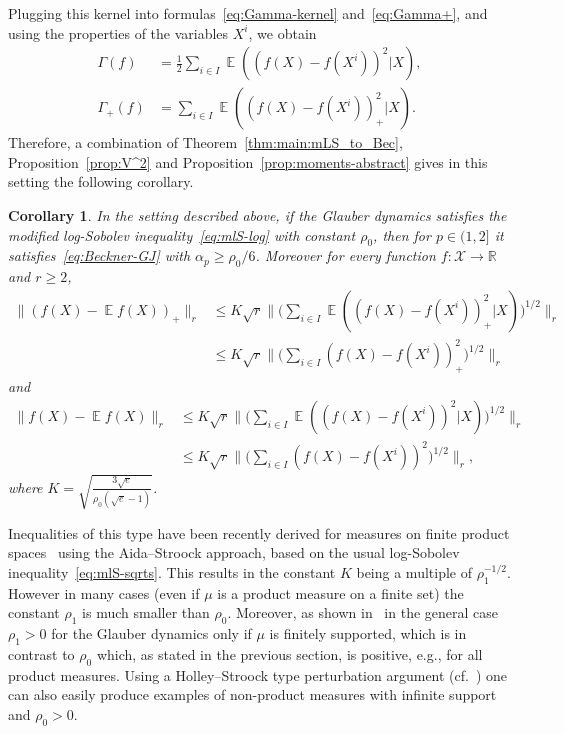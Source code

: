 \documentclass[a4paper]{amsart}
\newtheorem{corollary}[theorem]{Corollary} %
\theoremstyle{definition}
\theoremstyle{remark}
\numberwithin{equation}{section}
\newcommand*{\RR}{\mathbb{R}}
\DeclareMathOperator{\EE}{\mathbb{E}} %
\begin{document}
Plugging this kernel into formulas~\eqref{eq:Gamma-kernel} and~\eqref{eq:Gamma+}, and using the properties of the variables $X^i$, we obtain
\begin{align*}
  \Gamma(f) &= \frac{1}{2}\sum_{i\in I} \EE((f(X) - f(X^i))^2|X),\\
\Gamma_+(f) &= \sum_{i\in I} \EE((f(X) - f(X^i))^2_+|X).
\end{align*}
Therefore, a combination of Theorem~\ref{thm:main:mLS_to_Bec}, Proposition~\ref{prop:V^2} and Proposition~\ref{prop:moments-abstract} gives in this setting the following corollary.

\begin{corollary}\label{cor:Glauber}
In the setting described above, if the Glauber dynamics satisfies the modified log-Sobolev inequality~\eqref{eq:mlS-log} with constant $\rho_0$, then for $p \in (1,2]$ it satisfies~\eqref{eq:Beckner-GJ} with $\alpha_p \ge \rho_0/6$. Moreover for every function $f\colon \mathcal{X}\to \RR$ and $r\ge 2$,
\begin{align*}
  \|(f(X) - \EE f(X))_+\|_r  &\le K\sqrt{r}\Big \| \Big(\sum_{i\in I} \EE((f(X) - f(X^i))^2_+|X)\Big)^{1/2}\Big\|_r\\
 &\le K\sqrt{r}\Big \| \Big( \sum_{i\in I} (f(X) - f(X^i))^2_+\Big)^{1/2}\Big\|_r
\end{align*}
and
\begin{align*}
\|f(X) - \EE f(X)\|_r
&\le K\sqrt{r}\Big \| \Big(\sum_{i\in I} \EE((f(X) - f(X^i))^2|X)\Big)^{1/2}\Big\|_r\\
&\le K\sqrt{r}\Big \| \Big(\sum_{i\in I} (f(X) - f(X^i))^2\Big)^{1/2}\Big\|_r,
\end{align*}
where $K = \sqrt{\frac{3\sqrt{e}}{\rho_0(\sqrt{e}-1)}}$.
\end{corollary}

Inequalities of this type have been recently derived for measures on finite product spaces~\cite{gtze2018higher} using the Aida--Stroock approach, based on the usual log-Sobolev inequality~\eqref{eq:mlS-sqrts}. This results in the constant $K$ being a multiple of $\rho_1^{-1/2}$. However in many cases (even if $\mu$ is a product measure on a finite set) the constant $\rho_1$ is much smaller than $\rho_0$. Moreover,  as shown in~\cite{gtze2018concentration} in the general case $\rho_1 > 0$ for the Glauber dynamics only if $\mu$ is finitely supported, which is in contrast to $\rho_0$ which, as stated in the previous section, is positive, e.g., for all product measures. Using a Holley--Stroock type perturbation argument (cf.~\cite{MR893137,MR1845806}) one can also easily produce examples of non-product measures with infinite support and $\rho_0 > 0$.
\end{document}

